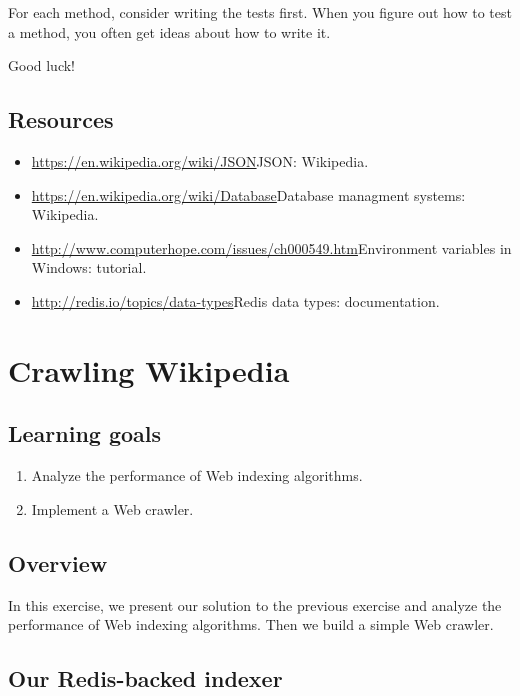 \documentclass[12pt]{book}
\theoremstyle{exercise}
\begin{document}
For each method, consider writing the tests first. When you figure out
how to test a method, you often get ideas about how to write it.

Good luck!

\section{Resources}\label{resources-13}

\begin{itemize}
\itemsep1pt\parskip0pt
\item
  \url{https://en.wikipedia.org/wiki/JSON}{JSON}: Wikipedia.
\item
  \url{https://en.wikipedia.org/wiki/Database}{Database managment
  systems}: Wikipedia.
\item
  \url{http://www.computerhope.com/issues/ch000549.htm}{Environment
  variables in Windows}: tutorial.
\item
  \url{http://redis.io/topics/data-types}{Redis data types}:
  documentation. 
\end{itemize}


\chapter{Crawling Wikipedia}

\section{Learning goals}\label{learning-goals-9}

\begin{enumerate}
\def\labelenumi{\arabic{enumi}.}
\itemsep1pt\parskip0pt
\item
  Analyze the performance of Web indexing algorithms.
\item
  Implement a Web crawler.
\end{enumerate}

\section{Overview}\label{overview-17}

In this exercise, we present our solution to the previous exercise and analyze the
performance of Web indexing algorithms. Then we build a simple Web
crawler.

\section{Our Redis-backed indexer}\label{our-redis-backed-indexer}
\end{document}
